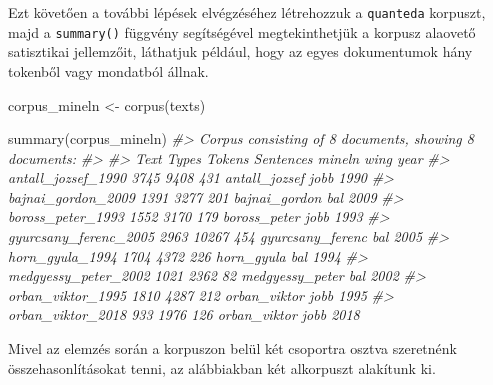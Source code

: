 \documentclass[
]{book}
\newenvironment{Shaded}{\begin{snugshade}}{\end{snugshade}}
\newcommand{\CommentTok}[1]{\textcolor[rgb]{0.56,0.35,0.01}{\textit{#1}}}
\newcommand{\FunctionTok}[1]{\textcolor[rgb]{0.00,0.00,0.00}{#1}}
\newcommand{\NormalTok}[1]{#1}
\newcommand{\OtherTok}[1]{\textcolor[rgb]{0.56,0.35,0.01}{#1}}
\begin{document}
Ezt követően a további lépések elvégzéséhez létrehozzuk a
\texttt{quanteda} korpuszt, majd a \texttt{summary()} függvény
segítségével megtekinthetjük a korpusz alaovető satisztikai jellemzőit,
láthatjuk például, hogy az egyes dokumentumok hány tokenből vagy
mondatból állnak.

\begin{Shaded}
\begin{Highlighting}[]

\NormalTok{corpus\_mineln }\OtherTok{\textless{}{-}} \FunctionTok{corpus}\NormalTok{(texts)}

\FunctionTok{summary}\NormalTok{(corpus\_mineln)}
\CommentTok{\#\textgreater{} Corpus consisting of 8 documents, showing 8 documents:}
\CommentTok{\#\textgreater{} }
\CommentTok{\#\textgreater{}                   Text Types Tokens Sentences           mineln wing year}
\CommentTok{\#\textgreater{}     antall\_jozsef\_1990  3745   9408       431    antall\_jozsef jobb 1990}
\CommentTok{\#\textgreater{}     bajnai\_gordon\_2009  1391   3277       201    bajnai\_gordon  bal 2009}
\CommentTok{\#\textgreater{}      boross\_peter\_1993  1552   3170       179     boross\_peter jobb 1993}
\CommentTok{\#\textgreater{}  gyurcsany\_ferenc\_2005  2963  10267       454 gyurcsany\_ferenc  bal 2005}
\CommentTok{\#\textgreater{}        horn\_gyula\_1994  1704   4372       226       horn\_gyula  bal 1994}
\CommentTok{\#\textgreater{}   medgyessy\_peter\_2002  1021   2362        82  medgyessy\_peter  bal 2002}
\CommentTok{\#\textgreater{}      orban\_viktor\_1995  1810   4287       212     orban\_viktor jobb 1995}
\CommentTok{\#\textgreater{}      orban\_viktor\_2018   933   1976       126     orban\_viktor jobb 2018}
\end{Highlighting}
\end{Shaded}

Mivel az elemzés során a korpuszon belül két csoportra osztva szeretnénk
összehasonlításokat tenni, az alábbiakban két alkorpuszt alakítunk ki.
\end{document}
